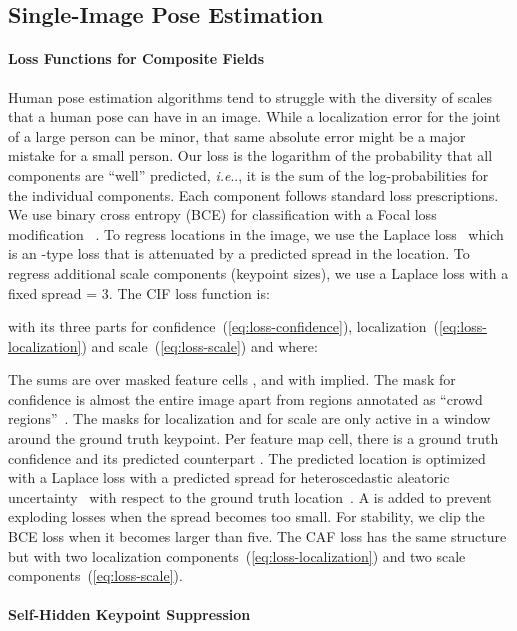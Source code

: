 \documentclass[journal]{IEEEtran}
\makeatletter
\newcommand{\hl}[1]{#1}
\DeclareRobustCommand\onedot{\futurelet\@let@token\@onedot}
\def\@onedot{\ifx\@let@token.\else.\null\fi\xspace}
\def\ie{\emph{i.e}\onedot} \def\Ie{\emph{I.e}\onedot}
\makeatother
\begin{document}
\subsection{Single-Image Pose Estimation}
\label{sec:single-image}


\paragraph{Loss Functions for Composite Fields}
\label{sec:loss-functions}
Human pose estimation algorithms tend to struggle with the diversity of scales that
a human pose can have in an image. While a localization error for the joint of
a large person can be minor, that same absolute error might be a major mistake
for a small person. Our loss is the logarithm of the probability that all
components are ``well'' predicted, \ie, it is the sum of the log-probabilities
for the individual components. Each component follows standard loss prescriptions.
We use binary cross entropy (BCE) for classification with a Focal loss
modification ~\cite{lin2017focal}.
To regress locations in the image, we use the Laplace loss~\cite{kendall2017uncertainties}
which is an -type loss
that is attenuated by a predicted spread  in the location.
To regress additional scale components (keypoint sizes), we use a Laplace loss with
a fixed spread  = 3.
The CIF loss function is:

with its three parts for confidence~(\ref{eq:loss-confidence}),
localization~(\ref{eq:loss-localization}) and scale~(\ref{eq:loss-scale})
and where:

The sums are over masked feature cells ,  and  with  implied.
The mask for confidence  is almost the entire image apart from regions
annotated as ``crowd regions''~\cite{lin2014microsoft}. The masks for localization
 and for scale  are only active in a  window around the
ground truth keypoint. Per feature map cell, there is a ground truth confidence
 and its predicted counterpart . The predicted location
 is optimized with a Laplace loss with a predicted
spread  for heteroscedastic aleatoric
uncertainty~\cite{kendall2017uncertainties} with respect to the ground truth
location~.
A  is added to prevent exploding losses when
the spread becomes too small. For stability, we clip the BCE loss when it becomes
\hl{larger than five}.
The CAF loss has the same structure but with two localization
components~(\ref{eq:loss-localization}) and two scale components~(\ref{eq:loss-scale}).



\paragraph{Self-Hidden Keypoint Suppression}
\end{document}
